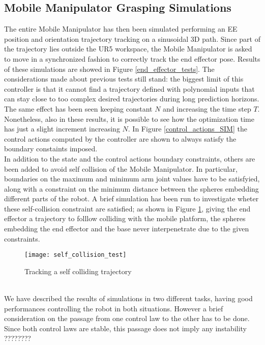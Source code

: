 \subsection{Mobile Manipulator Grasping Simulations}
The entire Mobile Manipulator has then been simulated performing an EE position and orientation trajectory tracking on a sinusoidal 3D path. Since part of the trajectory lies outside the UR5 workspace, the Mobile Manipulator is asked to move in a synchronized fashion to correctly track the end effector pose. 
Results of these simulations are showed in Figure \ref{end_effector_tests}. The considerations made about previous tests still stand: the biggest limit of this controller is that it cannot find a trajectory defined with polynomial inputs that can stay close to too complex desired trajectories during long prediction horizons. The same effect has been seen keeping constant $N$ and increasing the time step $T$. Nonetheless, also in these results, it is possible to see how the optimization time has just a slight increment increasing $N$. In Figure \ref{control_actions_SIM} the control actions computed by the controller are shown to always satisfy the boundary constaints imposed.\\
In addition to the state and the control actions boundary constraints, others are been added to avoid self collision of the Mobile Manipulator. In particular, boundaries on the maximum and minimum arm joint values have to be satisfyied, along with a constraint on the minimum distance between the spheres embedding different parts of the robot. A brief simulation has been run to investigate wheter these self-collision constraint are satisfied; as shown in Figure \ref{self_collision}, giving the end effector a trajectory to folllow colliding with the mobile platform, the spheres embedding the end effector and the base never interpenetrate due to the given constraints.
\begin{figure}[t]
	\centering
	\texttt{[image: self\_collision\_test]}
	\caption{Tracking a self colliding trajectory}
	\label{self_collision}
\end{figure}
\\
We have described the results of simulations in two different tasks, having good performances controlling the robot in both situations. However a brief consideration on the passage from one control law to the other has to be done. Since both control laws are stable, this passage does not imply any instability ????????

